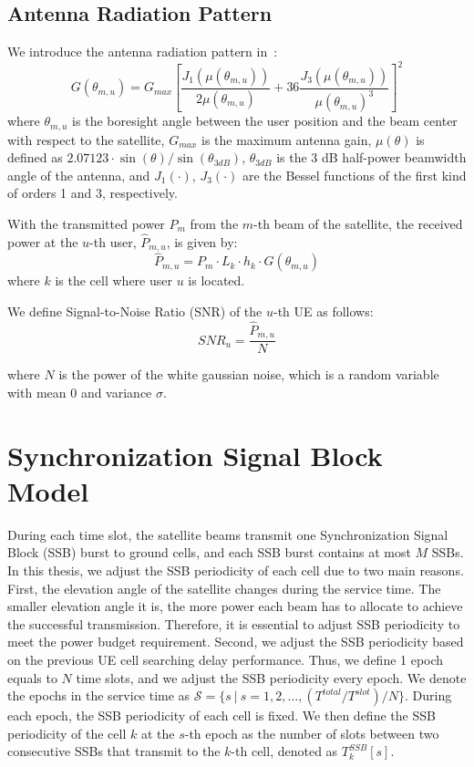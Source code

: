 \subsection{Antenna Radiation Pattern}
We introduce the antenna radiation pattern in~\cite{Energy-Efficient}:
\begin{equation}
    G(\theta_{m,u}) = G_{max} \left[ \frac{J_1\left(\mu(\theta_{m,u})\right)}{2\mu(\theta_{m,u})}
    + 36 \frac{J_3\left(\mu(\theta_{m,u})\right)}{\mu(\theta_{m,u})^3} \right]^2
\end{equation}
where $\theta_{m,u}$ is the boresight angle between the user position and the beam center with respect to the satellite, $G_{max}$ is the maximum antenna gain, $\mu(\theta)$ is defined as $2.07123 \cdot \sin(\theta)/\sin(\theta_{3dB})$, $\theta_{3dB}$ is the 3 dB half-power beamwidth angle of the antenna, and $J_1(\cdot)$, $J_3(\cdot)$ are the Bessel functions of the first kind of orders 1 and 3, respectively.

With the transmitted power $P_{m}$ from the $m$-th beam of the satellite, the received power at the $u$-th user, $\hat{P}_{m,u}$, is given by:
\begin{equation}
    \hat{P}_{m,u} = P_{m} \cdot L_{k} \cdot h_{k} \cdot G(\theta_{m,u})
\end{equation}
where $k$ is the cell where user $u$ is located.

We define Signal-to-Noise Ratio (SNR) of the $u$-th UE as follows:
\begin{equation}
    SNR_u = \frac{\hat{P}_{m,u}}{N}
\end{equation}

where $N$ is the power of the white gaussian noise, which is a random variable with mean $0$ and variance $\sigma$.
\section{Synchronization Signal Block Model}

During each time slot, the satellite beams transmit one Synchronization Signal Block (SSB) burst to ground cells, and each SSB burst contains at most $M$ SSBs. In this thesis, we adjust the SSB periodicity of each cell due to two main reasons. First, the elevation angle of the satellite changes during the service time. The smaller elevation angle it is, the more power each beam has to allocate to achieve the successful transmission. Therefore, it is essential to adjust SSB periodicity to meet the power budget requirement. Second, we adjust the SSB periodicity based on the previous UE cell searching delay performance. Thus, we define 1 epoch equals to $N$ time slots, and we adjust the SSB periodicity every epoch. We denote the epochs in the service time as $\mathcal{S} = \{s\ |\ s = 1, 2, \ldots, (T^{total} / T^{slot}) / N\}$. During each epoch, the SSB periodicity of each cell is fixed. We then define the SSB periodicity of the cell $k$ at the $s$-th epoch as the number of slots between two consecutive SSBs that transmit to the $k$-th cell, denoted as $T^{SSB}_k[s]$. 

